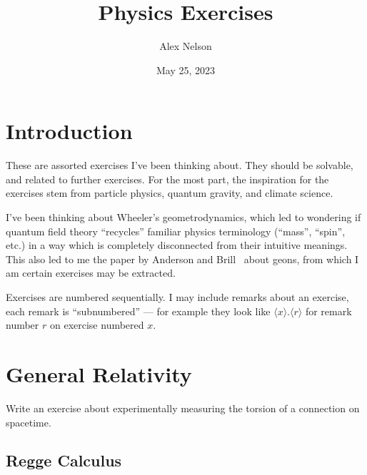 \documentclass{amsart}%
\title{Physics Exercises}
\author{Alex Nelson}
\date{May 25, 2023} %
\begin{document}
\maketitle
\tableofcontents

\section{Introduction}

These are assorted exercises I've been thinking about. They should be
solvable, and related to further exercises. For the most part, the
inspiration for the exercises stem from particle physics, quantum
gravity, and climate science.

I've been thinking about Wheeler's geometrodynamics, which led to
wondering if quantum field theory ``recycles'' familiar physics
terminology (``mass'', ``spin'', etc.) in a way which is completely
disconnected from their intuitive meanings. This also led to me the
paper by Anderson and Brill~\cite{Anderson:1996pu} about geons, from
which I am certain exercises may be extracted.

Exercises are numbered sequentially. I may include remarks about an
exercise, each remark is ``subnumbered'' --- for example they look like
$\langle x\rangle.\langle r\rangle$ for remark number $r$ on exercise
numbered $x$.



\section{General Relativity}

\begin{exercise}
Write an exercise about experimentally measuring the torsion of a
connection on spacetime.
\end{exercise}

\subsection{Regge Calculus}




\end{document}
